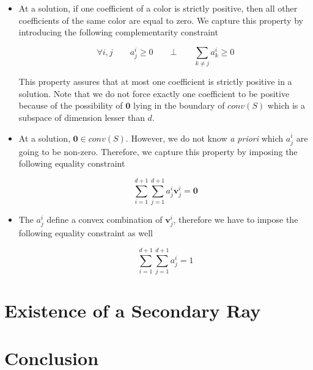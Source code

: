 \documentclass[a4paper,11pt]{article}
\def\org{\bm{0}}
\def\v{\textbf{v}}
\begin{document}
\begin{itemize}
\item At a solution, if one coefficient of a color is strictly positive, then all other coefficients of the same
color are equal to zero. We capture this property by introducing the following complementarity constraint

\[
\forall i, j \qquad a^i_j \geq 0 \qquad \bot \qquad \sum_{k \neq j} {a^i_k} \geq 0
\]

This property assures that at most one coefficient is strictly positive in a solution. Note that we do not force
exactly one coefficient to be positive because of the possibility of $\org$ lying in the boundary of $conv(S)$
which is a subspace of dimension lesser than $d$.

\item At a solution, $\org \in conv(S)$. However, we do not know \textit{a priori} which $a^i_j$ are going to be
non-zero. Therefore, we capture this property by imposing the following equality constraint

\[
\sum_{i = 1}^{d+1} { \sum_{j = 1}^{d+1} {a^i_j \v^i_j } } = \org
\]

\item The $a^i_j$ define a convex combination of $\v^i_j$, therefore we have to impose the following equality
constraint as well

\[
\sum_{i = 1}^{d+1} { \sum_{j = 1}^{d+1} {a^i_j} } = 1
\]


\end{itemize}

\section{Existence of a Secondary Ray}


\section{Conclusion}




\end{document}
